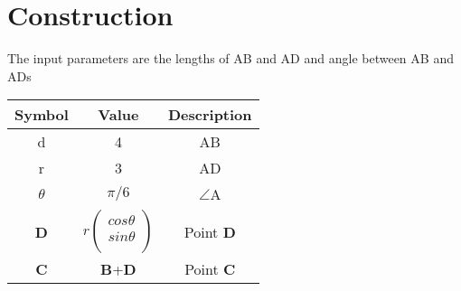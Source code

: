 \documentclass[journal,10pt,twocolumn]{article}
\begin{document}
\section*{Construction}
The input parameters are the lengths of AB and AD and angle between AB and ADs \vspace{2mm}\\
{
\setlength\extrarowheight{2pt}
\begin{tabular}{|c|c|c|}
	\hline
	\textbf{Symbol}&\textbf{Value}&\textbf{Description}\\
	\hline
	d&4&AB\\
	\hline
	r&3&AD\\
	\hline
	$\theta$&$\pi/6$&$\angle$A\\
	\hline
	\textbf{D}&$r%
	\begin{pmatrix}
		cos\theta\\
		sin\theta\\
	\end{pmatrix}$%
	&Point \textbf{D}\\
	\hline
	\textbf{C}&\textbf{B}+\textbf{D}
	&Point \textbf{C}\\
	\hline
\end{tabular}
}
\end{document}
